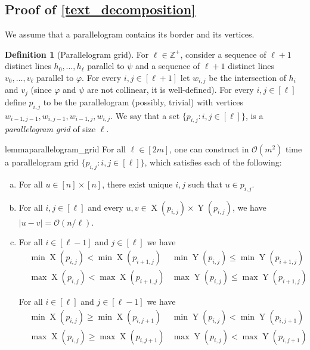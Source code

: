 \documentclass[11pt, letterpaper]{article}
\theoremstyle{plain}
\theoremstyle{definition}
\newtheorem{definition}{Definition}
\theoremstyle{remark}
\newcommand{\Z}{\mathbb{Z}}
\renewcommand{\O}{\mathcal{O}}
\renewcommand{\phi}{\varphi}
\newcommand{\eq}[1]{\begin{align*} #1 \end{align*}}
\DeclareMathOperator*{\X}{X}
\DeclareMathOperator*{\Y}{Y}
\begin{document}
\TextDecomposition


\subsection{Proof of \cref{text_decomposition}}
We assume that a parallelogram contains its border and its vertices.

\begin{definition}[Parallelogram grid]
For $\ell \in \Z^+$, consider a sequence of $\ell+1$  distinct lines $h_0, \dots, h_\ell$ parallel to $\psi$ and a sequence of $\ell+1$ distinct lines $v_0, \dots, v_\ell$ parallel to $\phi$. For every $i, j \in [\ell + 1]$ let $w_{i, j}$ be the intersection of $h_i$ and $v_j$ (since $\phi$ and $\psi$ are not collinear, it is well-defined). For every $i, j \in [\ell]$ define $p_{i, j}$ to be the parallelogram (possibly, trivial) with vertices $w_{i-1, j-1}, w_{i, j-1}, w_{i-1, j}, w_{i, j }$. We say that a set $\{p_{i,j} : i,j \in [\ell]\}$, is a \emph{parallelogram grid} of size $\ell$. 
\end{definition}

\begin{restatable}{lemma}{parallelogram_grid}\label{lm:parallelogram_grid}
For all $\ell \in [2m]$, one can construct in $\O(m^2)$ time a parallelogram grid $\{p_{i,j} : i,j \in [\ell]\}$, which satisfies each of the following:
\begin{enumerate}[(a)]
\item \label{it:unique} For all $u \in [n] \times [n]$, there exist unique $i,j$ such that $u \in p_{i,j}$.

\item \label{it:small_parallelogram} For all $i, j \in [\ell]$ and every $u, v \in \X(p_{i, j}) \times \Y(p_{i, j})$, we have $|u - v| = \O(n / \ell)$.

\item \label{it:monotonicity} For all $i \in [\ell - 1]$ and $j \in [\ell]$ we have
	\eq{
	&\min \X(p_{i, j}) < \min \X(p_{i + 1, j}) &\min \Y(p_{i, j}) \le \min \Y(p_{i + 1, j}) \\
	&\max \X(p_{i, j}) < \max \X(p_{i + 1, j})  &\max \Y(p_{i, j}) \le \max \Y(p_{i + 1, j})
	}
	
For all $i \in [\ell]$ and $j \in [\ell - 1]$ we have
	\eq{
		&\min \X(p_{i, j}) \ge \min \X(p_{i, j + 1})  &\min \Y(p_{i, j}) < \min \Y(p_{i, j + 1}) \\
		&\max \X(p_{i, j}) \ge \max \X(p_{i, j + 1})  &\max \Y(p_{i, j}) < \max \Y(p_{i, j + 1})
	}
\end{enumerate}
\end{restatable}
\end{document}
